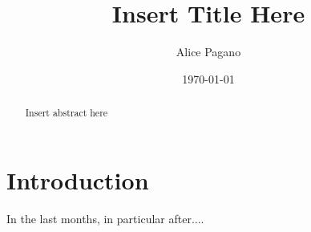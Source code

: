 \documentclass[prb,twocolumn,9pt]{revtex4-1}
\begin{document}

\title{Insert Title Here}



\author{Alice Pagano}


\date{\today}

\begin{abstract}

Insert abstract here

\end{abstract}


\maketitle



\section{Introduction}
\label{sec:introduction}

In the last months, in particular after....


    

\end{document}
